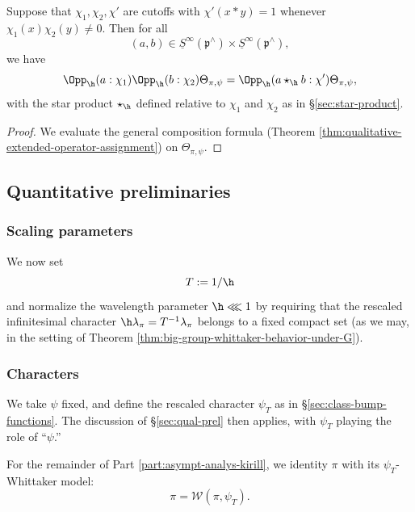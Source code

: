 \begin{lemma}\label{lem:action-opp-on-cal-W-delta}
  Suppose that $\chi_1, \chi_2, \chi '$ are cutoffs with $\chi '(x \ast y) = 1$ whenever $\chi_1(x) \chi_2(y) \neq 0$.  Then for all
  \begin{equation*}
    (a,b) \in \underline{S} ^\infty (\mathfrak{p}^\wedge ) \times \underline{S} ^{\infty } (\mathfrak{p} ^\wedge ),
  \end{equation*}
  we have
  \begin{equation*}
    \Opp_{\h}(a:\chi_1)
    \Opp_{\h}(b:\chi_2)  \Theta_{\pi,\psi}
    =
    \Opp_{\h}(a \star_{\h} b:\chi ') \Theta_{\pi,\psi},
  \end{equation*}
  with the star product $\star_{\h}$ defined relative to $\chi_1$ and $\chi_2$ as in \S\ref{sec:star-product}.
\end{lemma}
\begin{proof}
  We evaluate the general composition formula (Theorem \ref{thm:qualitative-extended-operator-assignment}) on $\Theta_{\pi,\psi}$.
\end{proof}

\subsection{Quantitative preliminaries}\label{sec:quant-prel}

\subsubsection{Scaling parameters}
We now
set
\begin{equation*}
  T := 1/\h
\end{equation*}
and normalize the wavelength parameter $\h \lll 1$ by requiring that the rescaled infinitesimal character $\h \lambda_\pi = T^{-1} \lambda_\pi$ belongs to a fixed compact set (as we may, in the setting of Theorem \ref{thm:big-group-whittaker-behavior-under-G}).

\subsubsection{Characters}
We take $\psi$ fixed, and define the rescaled character $\psi_T$ as in \S\ref{sec:class-bump-functions}.  The discussion of \S\ref{sec:qual-prel} then applies, with $\psi_T$ playing the role of ``$\psi$.''

For the remainder of Part \ref{part:asympt-analys-kirill}, we identity $\pi$ with its $\psi_T$-Whittaker model:
\begin{equation*}
  \pi = \mathcal{W}(\pi, \psi_T).
\end{equation*}

